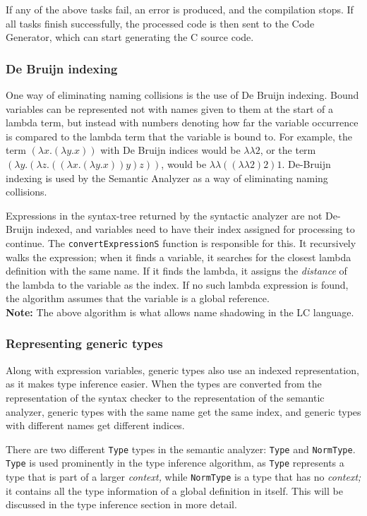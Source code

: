 \documentclass[12pt]{article}
\begin{document}
If any of the above tasks fail, an error is produced, and the compilation stops.
If all tasks finish successfully, the processed code is then sent to the Code
Generator, which can start generating the C source code.

\subsubsection{De Bruijn indexing}

One way of eliminating naming collisions is the use of De Bruijn indexing. Bound
variables can be represented not with names given to them at the start of a
lambda term, but instead with numbers denoting how far the variable occurrence
is compared to the lambda term that the variable is bound to. For example, the
term $(\lambda x. (\lambda y. x))$ with De Bruijn indices would be $\lambda
\lambda 2$, or the term $(\lambda y. (\lambda z. ((\lambda x. (\lambda y. x)) y)
z))$, would be $\lambda \lambda ((\lambda \lambda 2) 2) 1$. De-Bruijn indexing
is used by the Semantic Analyzer as a way of eliminating naming collisions.

Expressions in the syntax-tree returned by the syntactic analyzer are not
De-Bruijn indexed, and variables need to have their index assigned for
processing to continue. The \verb$convertExpressionS$ function is responsible
for this. It recursively walks the expression; when it finds a variable, it
searches for the closest lambda definition with the same name. If it finds the
lambda, it assigns the \emph{distance} of the lambda to the variable as the
index. If no such lambda expression is found, the algorithm assumes that the
variable is a global reference. \\
\textbf{Note:} The above algorithm is what allows name shadowing in the LC
language.

\subsubsection{Representing generic types}

Along with expression variables, generic types also use an indexed
representation, as it makes type inference easier. When the types are converted
from the representation of the syntax checker to the representation of the
semantic analyzer, generic types with the same name get the same index, and
generic types with different names get different indices.

There are two different \verb$Type$ types in the semantic analyzer: \verb$Type$
and \verb$NormType$. \verb$Type$ is used prominently in the type inference
algorithm, as \verb$Type$ represents a type that is part of a larger
\emph{context,} while \verb$NormType$ is a type that has no \emph{context;} it
contains all the type information of a global definition in itself. This will be
discussed in the type inference section in more detail.
\end{document}
